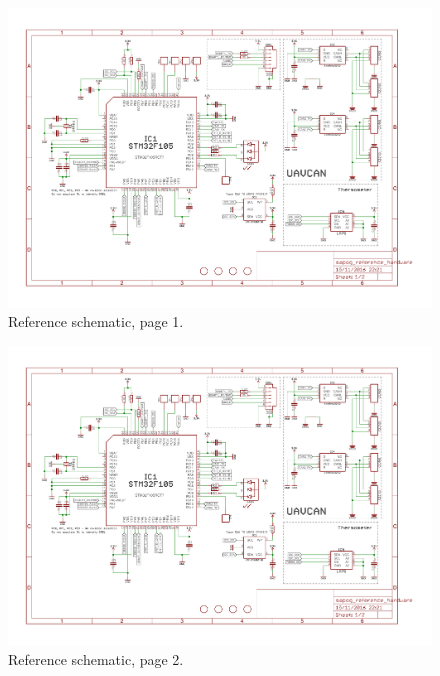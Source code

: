 \documentclass{zubaxdoc}
\begin{document}
\begin{figure}[hbt]
    \centering
    \includegraphics[page=1,angle=90,origin=c,width=1\textwidth]{sapog_reference_hardware.pdf}
	\caption{Reference schematic, page 1.}
\end{figure}

\begin{figure}[hbt]
    \centering
    \includegraphics[page=2,angle=90,origin=c,width=1\textwidth]{sapog_reference_hardware.pdf}
	\caption{Reference schematic, page 2.}
\end{figure}
\end{document}

